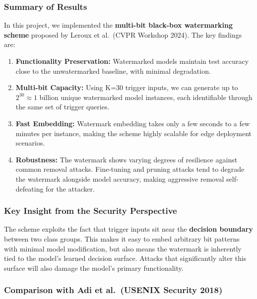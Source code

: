 \documentclass[11pt]{article}
\begin{document}
\subsubsection{Summary of Results}\label{summary-of-results}

In this project, we implemented the \textbf{multi-bit black-box
watermarking scheme} proposed by Leroux et al.~(CVPR Workshop 2024). The
key findings are:

\begin{enumerate}
\def\labelenumi{\arabic{enumi}.}
\item
  \textbf{Functionality Preservation:} Watermarked models maintain test
  accuracy close to the unwatermarked baseline, with minimal
  degradation.
\item
  \textbf{Multi-bit Capacity:} Using K=30 trigger inputs, we can
  generate up to \(2^{30} \approx 1\) billion unique watermarked model
  instances, each identifiable through the same set of trigger queries.
\item
  \textbf{Fast Embedding:} Watermark embedding takes only a few seconds
  to a few minutes per instance, making the scheme highly scalable for
  edge deployment scenarios.
\item
  \textbf{Robustness:} The watermark shows varying degrees of resilience
  against common removal attacks. Fine-tuning and pruning attacks tend
  to degrade the watermark alongside model accuracy, making aggressive
  removal self-defeating for the attacker.
\end{enumerate}

\subsubsection{Key Insight from the Security
Perspective}\label{key-insight-from-the-security-perspective}

The scheme exploits the fact that trigger inputs sit near the
\textbf{decision boundary} between two class groups. This makes it easy
to embed arbitrary bit patterns with minimal model modification, but
also means the watermark is inherently tied to the model's learned
decision surface. Attacks that significantly alter this surface will
also damage the model's primary functionality.

\subsubsection{Comparison with Adi et al.~(USENIX Security
2018)}\label{comparison-with-adi-et-al.-usenix-security-2018}
\end{document}
